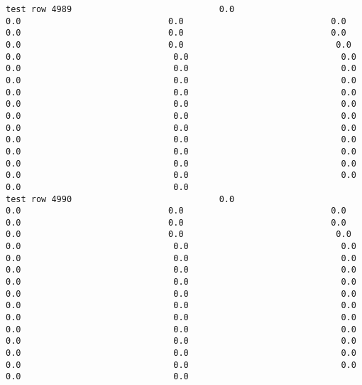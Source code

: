 \documentclass[11pt]{article}
\begin{document}
\begin{verbatim}
test row 4989                             0.0                             0.0                             0.0                             0.0                             0.0                             0.0                             0.0                             0.0                             0.0                              0.0                              0.0                              0.0                              0.0                              0.0                              0.0                              0.0                              0.0                              0.0                              0.0                              0.0                              0.0                              0.0                              0.0                              0.0                              0.0                              0.0                              0.0                              0.0                              0.0                              0.0                              0.0                              0.0                              0.0                              0.0                              0.0                              0.0                              0.0                              0.0                              0.0                              0.0                              0.0                              0.0                              0.0                              0.0                              0.0
test row 4990                             0.0                             0.0                             0.0                             0.0                             0.0                             0.0                             0.0                             0.0                             0.0                              0.0                              0.0                              0.0                              0.0                              0.0                              0.0                              0.0                              0.0                              0.0                              0.0                              0.0                              0.0                              0.0                              0.0                              0.0                              0.0                              0.0                              0.0                              0.0                              0.0                              0.0                              0.0                              0.0                              0.0                              0.0                              0.0                              0.0                              0.0                              0.0                              0.0                              0.0                              0.0                              0.0                              0.0                              0.0                              0.0

\end{verbatim}
\end{document}
